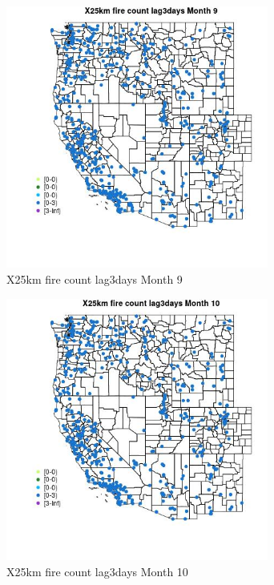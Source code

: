 \begin{figure} 
\centering  
\includegraphics[width=0.77\textwidth]{Code_Outputs/Report_ML_input_PM25_Step4_part_e_de_duplicated_aves_compiled_2019-05-14wNAs_MapObsMo9X25km_fire_count_lag3days.jpg} 
\caption{\label{fig:Report_ML_input_PM25_Step4_part_e_de_duplicated_aves_compiled_2019-05-14wNAsMapObsMo9X25km_fire_count_lag3days}X25km fire count lag3days Month 9} 
\end{figure} 
 

\begin{figure} 
\centering  
\includegraphics[width=0.77\textwidth]{Code_Outputs/Report_ML_input_PM25_Step4_part_e_de_duplicated_aves_compiled_2019-05-14wNAs_MapObsMo10X25km_fire_count_lag3days.jpg} 
\caption{\label{fig:Report_ML_input_PM25_Step4_part_e_de_duplicated_aves_compiled_2019-05-14wNAsMapObsMo10X25km_fire_count_lag3days}X25km fire count lag3days Month 10} 
\end{figure} 
 

